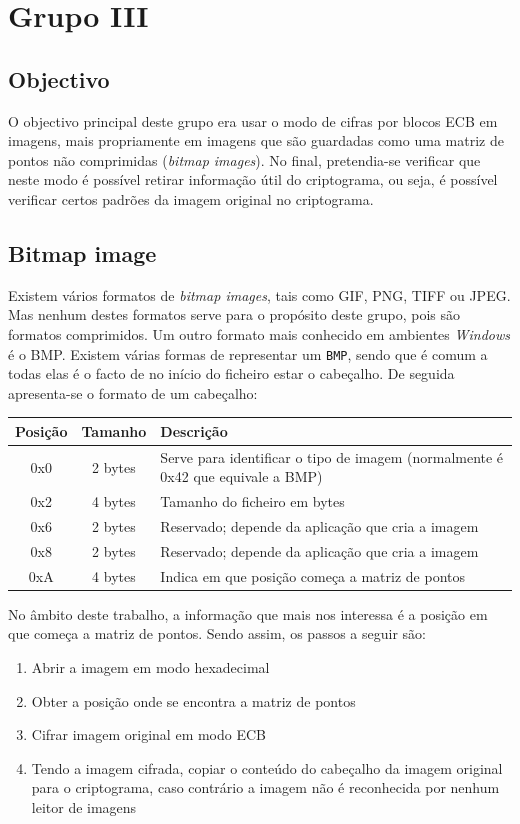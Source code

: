 \chapter{Grupo III}
\section{Objectivo}
O objectivo principal deste grupo era usar o modo de cifras por blocos ECB em imagens, mais propriamente em imagens que são guardadas como uma matriz de pontos não comprimidas (\textit{bitmap images}). No final, pretendia-se verificar que neste modo é possível retirar informação útil do criptograma, ou seja, é possível verificar certos padrões da imagem original no criptograma.
%
\section{Bitmap image}
Existem vários formatos de \textit{bitmap images}, tais como \textsf{GIF}, \textsf{PNG}, \textsf{TIFF} ou \textsf{JPEG}. Mas nenhum destes formatos serve para o propósito deste grupo, pois são formatos comprimidos. Um outro formato mais conhecido em ambientes \textit{Windows} é o \textsf{BMP}.
Existem várias formas de representar um \verb|BMP|, sendo que é comum a todas elas é o facto de no início do ficheiro estar o cabeçalho. De seguida apresenta-se o formato de um cabeçalho:
\begin{center}
\begin{tabular}{| c | c | p{7cm} |}
  \hline
  \textbf{Posição} & \textbf{Tamanho} & \textbf{Descrição} \\
  \hline
  0x0 & 2 bytes & Serve para identificar o tipo de imagem (normalmente é 0x42 que equivale a \textsf{BMP}) \\
  \hline
  0x2 & 4 bytes & Tamanho do ficheiro em bytes \\
  \hline
  0x6 & 2 bytes & Reservado; depende da aplicação que cria a imagem \\
  \hline
  0x8 & 2 bytes & Reservado; depende da aplicação que cria a imagem \\
  \hline
  0xA & 4 bytes & Indica em que posição começa a matriz de pontos \\
  \hline
\end{tabular}
\end{center}
No âmbito deste trabalho, a informação que mais nos interessa é a posição em que começa a matriz de pontos. Sendo assim, os passos a seguir são:
\begin{enumerate}
  \item Abrir a imagem em modo hexadecimal
  \item Obter a posição onde se encontra a matriz de pontos
  \item Cifrar imagem original em modo ECB
  \item Tendo a imagem cifrada, copiar o conteúdo do cabeçalho da imagem original para o criptograma, caso contrário a imagem não é reconhecida por nenhum leitor de imagens
\end{enumerate}
%
